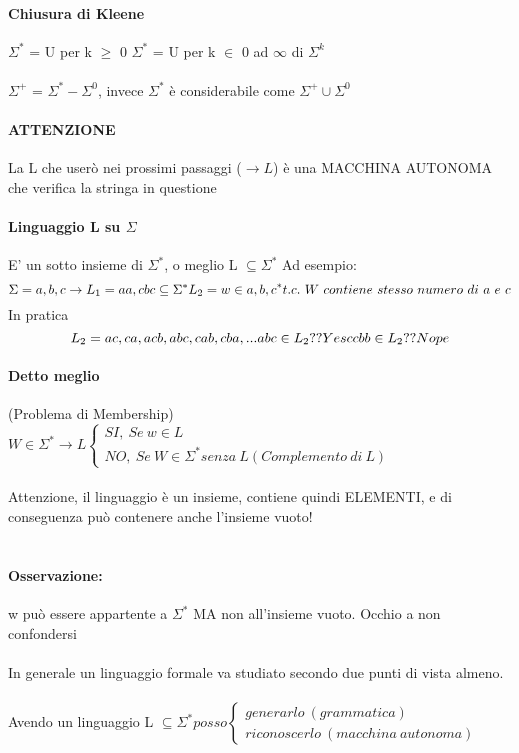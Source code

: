 \documentclass[12pt, a4paper, openany, oneside]{book}
\begin{document}
\paragraph{Chiusura di Kleene}
$\Sigma ^{*}$ = U per k $\geq$ 0 $\Sigma ^{*}$ = U per k $\in$ {0 ad $\infty$}
di $\Sigma ^{k}$
\\ \\
$\Sigma ^{+}$ = $\Sigma ^{*} - \Sigma ^{0}$, invece $\Sigma ^{*}$ è considerabile
come $\Sigma ^{+} \cup \Sigma ^{0}$
\paragraph{ATTENZIONE} La L che userò nei prossimi passaggi ($\to L$) è una MACCHINA 
AUTONOMA che verifica la stringa in questione
\paragraph{Linguaggio L su $\Sigma$}
E' un sotto insieme di $\Sigma ^{*}$, o meglio L  $\subseteq \Sigma ^{*}$ 
Ad esempio:
$$\Sigma = {a, b, c} \to L_{1}={aa, cbc}  \subseteq \Sigma ^{*} \\
L_{2} = {w \in {a,b,c}^{*} t.c. ~ W ~ contiene ~ stesso ~ numero~di~a~e~c} $$
In pratica
$$L_{2} = {ac, ca, acb, abc, cab, cba, ...}\\
abc \in L_{2}?? Yes\\
ccbb \in L_{2}?? Nope$$ 
\paragraph{Detto meglio} (Problema di Membership) \\ $W \in \Sigma ^{*} \to L 
\begin{cases}
SI, ~ Se ~ w \in L \\
NO, ~ Se ~ W \in \Sigma ^{*} senza ~ L (Complemento~di~L)
\end{cases}$ \\ \\
Attenzione, il linguaggio è un insieme, contiene quindi ELEMENTI, e di 
conseguenza può contenere anche l'insieme vuoto! \\ \\
\paragraph{Osservazione:} w può essere appartente a $\Sigma ^{*}$ MA non 
all'insieme vuoto. Occhio a non confondersi
\\ \\
In generale un linguaggio formale va studiato secondo due punti di vista almeno.
\\ \\
Avendo un linguaggio L  $\subseteq \Sigma ^{*} posso 
\begin{cases}
generarlo ~(grammatica)\\
riconoscerlo ~(macchina~autonoma)
\end{cases}$
\end{document}

